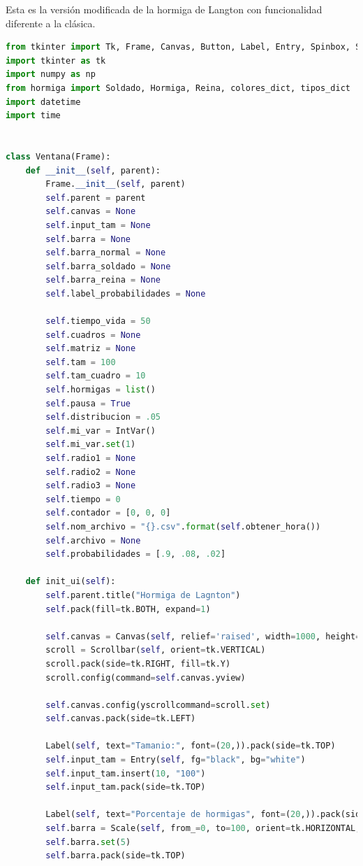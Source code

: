 Esta es la versión modificada de la hormiga de Langton con funcionalidad diferente a la clásica.
\begin{lstlisting}[language=Python]
from tkinter import Tk, Frame, Canvas, Button, Label, Entry, Spinbox, Scrollbar, Radiobutton, IntVar, Scale, StringVar
import tkinter as tk
import numpy as np
from hormiga import Soldado, Hormiga, Reina, colores_dict, tipos_dict
import datetime
import time


class Ventana(Frame):
    def __init__(self, parent):
        Frame.__init__(self, parent)
        self.parent = parent
        self.canvas = None
        self.input_tam = None
        self.barra = None
        self.barra_normal = None
        self.barra_soldado = None
        self.barra_reina = None
        self.label_probabilidades = None

        self.tiempo_vida = 50
        self.cuadros = None
        self.matriz = None
        self.tam = 100
        self.tam_cuadro = 10
        self.hormigas = list()
        self.pausa = True
        self.distribucion = .05
        self.mi_var = IntVar()
        self.mi_var.set(1)
        self.radio1 = None
        self.radio2 = None
        self.radio3 = None
        self.tiempo = 0
        self.contador = [0, 0, 0]
        self.nom_archivo = "{}.csv".format(self.obtener_hora())
        self.archivo = None
        self.probabilidades = [.9, .08, .02]

    def init_ui(self):
        self.parent.title("Hormiga de Lagnton")
        self.pack(fill=tk.BOTH, expand=1)

        self.canvas = Canvas(self, relief='raised', width=1000, height=1000)
        scroll = Scrollbar(self, orient=tk.VERTICAL)
        scroll.pack(side=tk.RIGHT, fill=tk.Y)
        scroll.config(command=self.canvas.yview)

        self.canvas.config(yscrollcommand=scroll.set)
        self.canvas.pack(side=tk.LEFT)

        Label(self, text="Tamanio:", font=(20,)).pack(side=tk.TOP)
        self.input_tam = Entry(self, fg="black", bg="white")
        self.input_tam.insert(10, "100")
        self.input_tam.pack(side=tk.TOP)

        Label(self, text="Porcentaje de hormigas", font=(20,)).pack(side=tk.TOP)
        self.barra = Scale(self, from_=0, to=100, orient=tk.HORIZONTAL, tickinterval=50)
        self.barra.set(5)
        self.barra.pack(side=tk.TOP)


\end{lstlisting}
